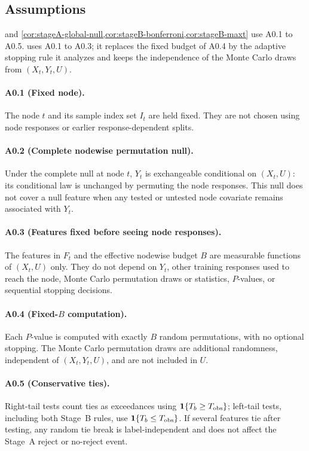\subsection{Assumptions}
\label{app:assumptions}

 and
\cref{cor:stageA-global-null,cor:stageB-bonferroni,cor:stageB-maxt} use A0.1 to
A0.5.  uses A0.1 to A0.3; it replaces the fixed budget
of A0.4 by the adaptive stopping rule it analyzes and keeps the independence of
the Monte Carlo draws from $(X_t,Y_t,U)$.

\paragraph{A0.1 (Fixed node).}\label{assump:fixed-node}
The node $t$ and its sample index set $I_t$ are held fixed. They
are not chosen using node responses or earlier response-dependent splits.

\paragraph{A0.2 (Complete nodewise permutation null).}\label{assump:exchangeability}
Under the complete null at node $t$, $Y_t$ is exchangeable conditional on
$(X_t,U)$: its conditional law is unchanged by permuting the node responses.
This null does not cover a null feature when any
tested or untested node covariate remains associated with $Y_t$.

\paragraph{A0.3 (Features fixed before seeing node responses).}\label{assump:label-independence}
The features in $F_t$ and the effective nodewise budget $B$ are measurable
functions of $(X_t,U)$ only. They do not depend on $Y_t$, other training
responses used to reach the node, Monte Carlo permutation draws or statistics,
$P$-values, or sequential stopping decisions.

\paragraph{A0.4 (Fixed-$B$ computation).}\label{assump:fixed-b}
Each $P$-value is computed with exactly $B$ random permutations, with no optional
stopping. The Monte Carlo permutation draws are
additional randomness, independent of $(X_t,Y_t,U)$, and are not included in
$U$.

\paragraph{A0.5 (Conservative ties).}\label{assump:ties}
Right-tail tests count ties as exceedances using
$\mathbf{1}\{T_b \ge T_{\mathrm{obs}}\}$; left-tail tests, including both Stage~B
rules, use $\mathbf{1}\{T_b \le T_{\mathrm{obs}}\}$. If several features tie after
testing, any random tie break is label-independent and does not affect the
Stage~A reject or no-reject event.
